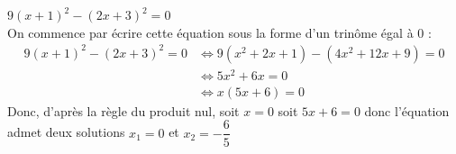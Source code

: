\documentclass[12pt,a4paper]{book}
\begin{document}
\begin{enumMet}
    \item $9(x+1)^{2}-(2 x+3)^{2}=0$\\
    On commence par écrire cette équation sous la forme d'un trinôme égal à 0 :\\
    $$
    \begin{aligned}
    9(x+1)^{2}-(2 x+3)^{2}=0 & \Leftrightarrow 9\left(x^{2}+2 x+1\right)-\left(4 x^{2}+12 x+9\right)=0 \\
    & \Leftrightarrow 5 x^{2}+6 x=0 \\
    & \Leftrightarrow x(5 x+6)=0
    \end{aligned}
    $$
    Donc, d'après la règle du produit nul, soit $x=0$ soit $5 x+6=0$ donc l'équation admet deux solutions $x_{1}=0$ et $x_{2}=-\dfrac{6}{5}$\\
\end{enumMet}

\end{document}
